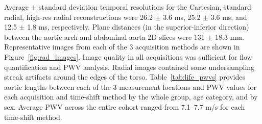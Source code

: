 Average $\pm$ standard deviation temporal resolutions for the Cartesian, standard radial, high-res radial reconstructions were 26.2 $\pm$ 3.6 ms, 25.2 $\pm$ 3.6 ms, and 12.5 $\pm$ 1.8 ms, respectively. Plane distances (in the superior-inferior direction) between the aortic arch and abdominal aorta 2D slices were 131 $\pm$ 18.3 mm. Representative images from each of the 3 acquisition methods are shown in Figure~\ref{fig:rad_images}. Image quality in all acquisitions was sufficient for flow quantification and PWV analysis. Radial images contained some undersampling streak artifacts around the edges of the torso. Table~\ref{tab:life_pwvs} provides aortic lengths between each of the 3 measurement locations and PWV values for each acquisition and time-shift method by the whole group, age category, and by sex. Average PWV across the entire cohort ranged from 7.1--7.7 m/s for each time-shift method.

